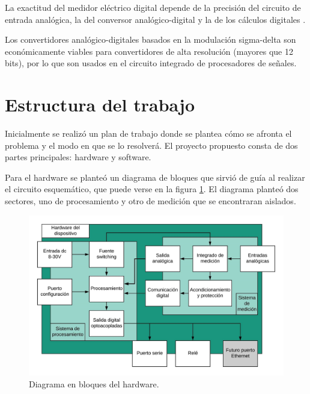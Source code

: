 
La exactitud del medidor eléctrico digital depende de la precisión del circuito de entrada analógica, la del conversor analógico-digital y la de los cálculos digitales \citep{Hribik2004DigitalPA}.

Los convertidores analógico-digitales basados en la modulación sigma-delta son económicamente viables para convertidores de alta resolución (mayores que 12 bits), por lo que son  usados en el circuito integrado de procesadores de señales.



\section{Estructura del trabajo}

\label{sec:structdescript1}
Inicialmente se realizó un plan de trabajo \cite{planTrabajo} donde se plantea cómo se afronta el problema y el modo en que se lo resolverá. El proyecto propuesto consta de dos partes principales: hardware y software.

Para el hardware se planteó un diagrama de bloques que sirvió de guía al realizar el circuito esquemático, que puede verse en la figura \ref{fig:bloquess1}. El diagrama planteó dos sectores, uno de procesamiento y otro de medición que se encontraran aislados.

\begin{figure}[h]
	\centering
	\includegraphics[width=\textwidth,keepaspectratio]{Figures/concepto.png}
	\caption{Diagrama en bloques del hardware.}
	\label{fig:bloquess1}
\end{figure}

